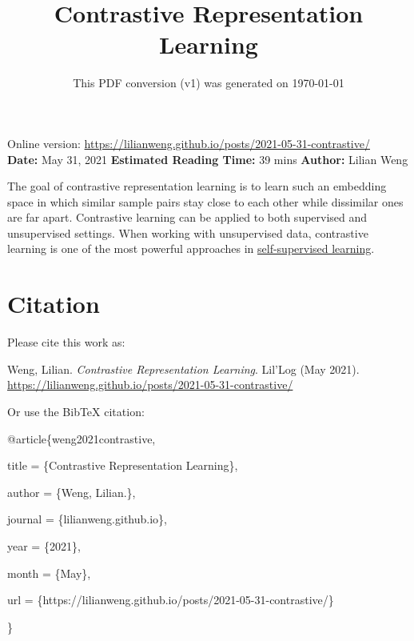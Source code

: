 \documentclass[12pt]{article}
\title{Contrastive Representation Learning}
\date{This PDF conversion (v1) was generated on \today\footnotemark}
\begin{document}
\maketitle
\begin{center}
    Online version: \url{https://lilianweng.github.io/posts/2021-05-31-contrastive/} \\
    \textbf{Date:} May 31, 2021 \quad
    \textbf{Estimated Reading Time:}  39 mins \quad
    \textbf{Author:} Lilian Weng
\end{center}

The goal of contrastive representation learning is to learn such an embedding space in which similar sample pairs stay close to each other while dissimilar ones are far apart. Contrastive learning can be applied to both supervised and unsupervised settings. When working with unsupervised data, contrastive learning is one of the most powerful approaches in \href{https://lilianweng.github.io/posts/2019-11-10-self-supervised/}{self-supervised learning}.


\newpage
\tableofcontents
\newpage
\vspace{1em}
\n\n\n\section{Citation}
Please cite this work as:

\begin{tcolorbox}[colback=black!5!white, colframe=black!80!white, boxrule=0.5pt, arc=2mm, left=1mm, right=1mm, top=1mm, bottom=1mm]
  Weng, Lilian. \textit{Contrastive Representation Learning}. Lil'Log (May 2021). \url{https://lilianweng.github.io/posts/2021-05-31-contrastive/}
\end{tcolorbox}

Or use the Bib\TeX{} citation:

\begin{tcolorbox}[
    colback=black!5!white,
    colframe=black!80!white,
    boxrule=0.5pt,
    arc=2mm,
    left=1mm,
    right=1mm,
    top=1mm,
    bottom=1mm,
    listing only,
    listing options={
      basicstyle=\ttfamily\footnotesize,
      breaklines=true,
      literate={\{}{{\char`\{}}1 {\}}{{\char`\}}}1
    }
  ]

@article\{weng2021contrastive,

  title   = \{Contrastive Representation Learning\},

  author  = \{Weng, Lilian.\},

  journal = \{lilianweng.github.io\},

  year    = \{2021\},

  month   = \{May\},

  url     = \{https://lilianweng.github.io/posts/2021-05-31-contrastive/\}

\}
\end{tcolorbox}
\end{document}
